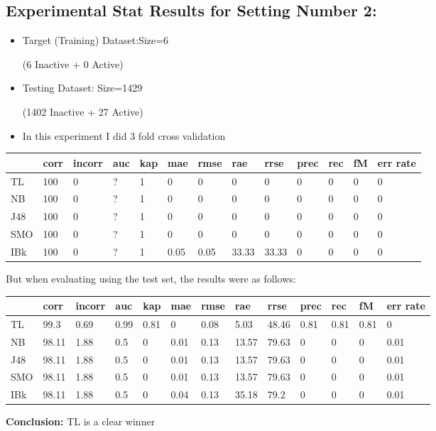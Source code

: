 \documentclass[a4paper,12pt, english]{article}
\begin{document}
\subsection{Experimental Stat Results for Setting Number 2:}
\begin{itemize}
\item Target (Training) Dataset:Size=6 \begin{scriptsize}(6 Inactive + 0 Active)\end{scriptsize}
\item Testing Dataset: Size=1429 \begin{scriptsize}(1402 Inactive + 27 Active)\end{scriptsize}
\item In this experiment I did 3 fold cross validation
\end{itemize}  
\begin{small}
\begin{center}
    \begin{tabular}{ | l | l | l | l | l | l | l | l | l | l | l | l | l |}
    \hline
      	& corr & incorr  & auc & kap & mae & rmse & rae & rrse & prec & rec & fM & err rate\\ \hline
      	TL & 100 & 0 & ? & 1 & 0 & 0 & 0 & 0 & 0 & 0 & 0 & 0\\ \hline
	NB & 100 & 0 & ? & 1 & 0 & 0 & 0 & 0 & 0 & 0 & 0 & 0\\ \hline
	J48 & 100 & 0 & ? & 1 & 0 & 0 & 0 & 0 & 0 & 0 & 0 & 0\\ \hline
	SMO & 100 & 0 & ? & 1 & 0 & 0 & 0 & 0 & 0 & 0 & 0 & 0\\ \hline
	IBk & 100 & 0 & ? & 1 & 0.05 & 0.05 & 33.33 & 33.33 & 0 & 0 & 0 & 0\\ \hline  
    \end{tabular}       
\end{center}
\end{small}

But when evaluating using the test set, the results were as follows:
\begin{small}
\begin{center}
    \begin{tabular}{ | l | l | l | l | l | l | l | l | l | l | l | l | l |}
    \hline
      	& corr & incorr  & auc & kap & mae & rmse & rae & rrse & prec & rec & fM & err rate\\ \hline
      	TL & 99.3 & 0.69 & 0.99 & 0.81 & 0 & 0.08 & 5.03 & 48.46 & 0.81 & 0.81 & 0.81 & 0\\ \hline
	NB & 98.11 & 1.88 & 0.5 & 0 & 0.01 & 0.13 & 13.57 & 79.63 & 0 & 0 & 0 & 0.01\\ \hline
	J48 & 98.11 & 1.88 & 0.5 & 0 & 0.01 & 0.13 & 13.57 & 79.63 & 0 & 0 & 0 & 0.01\\ \hline
	SMO & 98.11 & 1.88 & 0.5 & 0 & 0.01 & 0.13 & 13.57 & 79.63 & 0 & 0 & 0 & 0.01\\ \hline
	IBk & 98.11 & 1.88 & 0.5 & 0 & 0.04 & 0.13 & 35.18 & 79.2 & 0 & 0 & 0 & 0.01\\ \hline  
    \end{tabular}       
\end{center}
\end{small}
\textbf{Conclusion:} TL is a clear winner
\end{document}
